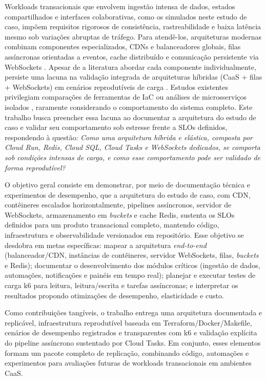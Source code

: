 Workloads transacionais que envolvem ingestão intensa de dados, estados compartilhados e
interfaces colaborativas, como os simulados neste estudo de caso, impõem requisitos
rigorosos de consistência, rastreabilidade e baixa latência mesmo sob variações abruptas de
tráfego. Para atendê-los, arquiteturas modernas combinam componentes especializados, CDNs e
balanceadores globais, filas assíncronas orientadas a eventos, cache distribuído e comunicação
persistente via WebSockets \cite{barri_scalability_2025, confluent_eda_2024,
yadav_redis_leaderboard_2019, fernando_websocket_2025}. Apesar de a literatura abordar cada
componente individualmente, persiste uma lacuna na validação integrada de arquiteturas
híbridas (CaaS + filas + WebSockets) em cenários reprodutíveis de carga
\cite{wjaets_serverless_ml_2022, abad_serverless_gap_2021}. Estudos existentes privilegiam
comparações de ferramentas de IaC \cite{pessa_iac_2023} ou análises de microsserviços
isolados \cite{hebbar_reactive_2025}, raramente considerando o comportamento do sistema
completo. Este trabalho busca preencher essa lacuna ao documentar a arquitetura do
estudo de caso e validar seu comportamento sob estresse frente a SLOs definidos, respondendo
à questão: \textit{Como uma arquitetura híbrida e elástica, composta por Cloud Run, Redis,
Cloud SQL, Cloud Tasks e WebSockets dedicados, se comporta sob condições intensas de carga,
e como esse comportamento pode ser validado de forma reprodutível?}

O objetivo geral consiste em demonstrar, por meio de documentação técnica e experimentos
de desempenho, que a arquitetura do estudo de caso, com CDN, contêineres escalados
horizontalmente, pipelines assíncronos, servidor de WebSockets, armazenamento em
\textit{buckets} e cache Redis, sustenta os SLOs definidos para um produto transacional
completo, mantendo código, infraestrutura e observabilidade versionados em repositório. Esse
objetivo se desdobra em metas específicas: mapear a arquitetura \textit{end-to-end}
(balanceador/CDN, instâncias de contêineres, servidor WebSockets, filas, \textit{buckets} e
Redis); documentar o desenvolvimento dos módulos críticos (ingestão de dados, automações,
notificações e painéis em tempo real); planejar e executar testes de carga k6 para leitura,
leitura/escrita e tarefas assíncronas; e interpretar os resultados propondo otimizações de
desempenho, elasticidade e custo.

Como contribuições tangíveis, o trabalho entrega uma arquitetura documentada e replicável,
infraestrutura reprodutível baseada em Terraform/Docker/Makefile, cenários de desempenho
registrados e transparentes com k6 e validação explícita do pipeline assíncrono sustentado por
Cloud Tasks. Em conjunto, esses elementos formam um pacote completo de replicação,
combinando código, automações e experimentos para avaliações futuras de workloads
transacionais em ambientes CaaS.

